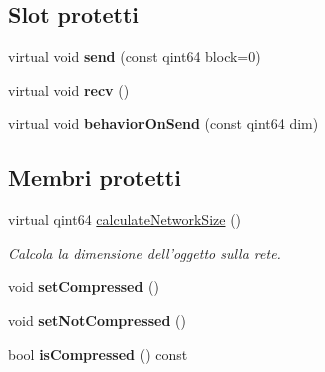 \subsection*{Slot protetti}
\begin{DoxyCompactItemize}
\item 
\hypertarget{class_k_cloud_1_1_resource_a3084fc9b2fb3f62637bb63e3f3e22915}{virtual void {\bfseries send} (const qint64 block=0)}\label{class_k_cloud_1_1_resource_a3084fc9b2fb3f62637bb63e3f3e22915}

\item 
\hypertarget{class_k_cloud_1_1_resource_a1c47f6808a43c451c700f0f4384f9e92}{virtual void {\bfseries recv} ()}\label{class_k_cloud_1_1_resource_a1c47f6808a43c451c700f0f4384f9e92}

\item 
\hypertarget{class_k_cloud_1_1_resource_ae2c7297f55bf8367b215e216db334a62}{virtual void {\bfseries behavior\-On\-Send} (const qint64 dim)}\label{class_k_cloud_1_1_resource_ae2c7297f55bf8367b215e216db334a62}

\end{DoxyCompactItemize}
\subsection*{Membri protetti}
\begin{DoxyCompactItemize}
\item 
virtual qint64 \hyperlink{class_k_cloud_1_1_resource_a2dd84655d4288eaf8127e2c7d8f0cabf}{calculate\-Network\-Size} ()
\begin{DoxyCompactList}\small\item\em Calcola la dimensione dell'oggetto sulla rete. \end{DoxyCompactList}\item 
\hypertarget{class_k_cloud_1_1_resource_ae7bcdab5a24cbc7a969fb4a582389fea}{void {\bfseries set\-Compressed} ()}\label{class_k_cloud_1_1_resource_ae7bcdab5a24cbc7a969fb4a582389fea}

\item 
\hypertarget{class_k_cloud_1_1_resource_a4a4467a5a97b83d09c8ec1b8a00462a1}{void {\bfseries set\-Not\-Compressed} ()}\label{class_k_cloud_1_1_resource_a4a4467a5a97b83d09c8ec1b8a00462a1}

\item 
\hypertarget{class_k_cloud_1_1_resource_a20e53a5eb5137fdc9eeb4faac428c24f}{bool {\bfseries is\-Compressed} () const }\label{class_k_cloud_1_1_resource_a20e53a5eb5137fdc9eeb4faac428c24f}

\end{DoxyCompactItemize}
